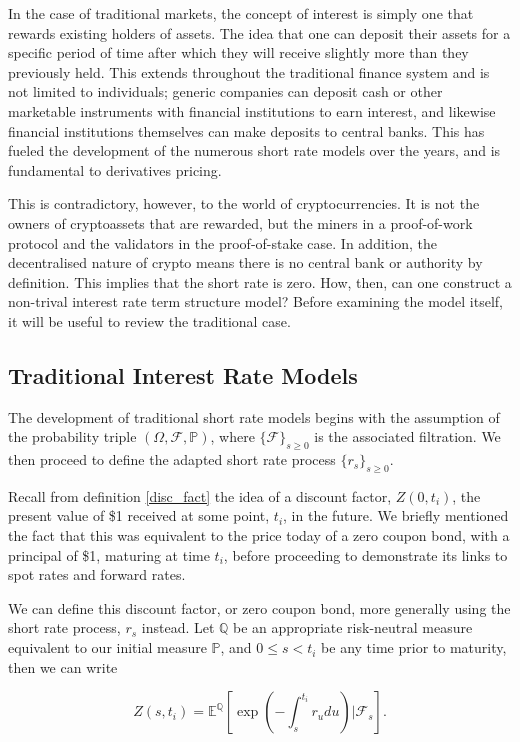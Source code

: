 In the case of traditional markets, the concept of interest is simply one that rewards existing holders of assets. The idea that one can deposit their assets for a specific period of time after which they will receive slightly more than they previously held. This extends throughout the traditional finance system and is not limited to individuals; generic companies can deposit cash or other marketable instruments with financial institutions to earn interest, and likewise financial institutions themselves can make deposits to central banks. This has fueled the development of the numerous short rate models over the years, and is fundamental to derivatives pricing. 

This is contradictory, however, to the world of cryptocurrencies. It is not the owners of cryptoassets that are rewarded, but the miners in a proof-of-work protocol and the validators in the proof-of-stake case. In addition, the decentralised nature of crypto means there is no central bank or authority by definition. This implies that the short rate is zero. How, then, can one construct a non-trival interest rate term structure model? Before examining the model itself, it will be useful to review the traditional case.

\subsection{Traditional Interest Rate Models}
The development of traditional short rate models begins with the assumption of the probability triple $(\Omega, \mathcal{F}, \mathbb{P})$, where $\{\mathcal{F}\}_{s \geq 0}$ is the associated filtration. We then proceed to define the adapted short rate process $\{r_s\}_{s \geq 0}$. 

Recall from definition \ref{disc_fact} the idea of a discount factor, $Z(0,t_i)$, the present value of \$1 received at some point, $t_i$, in the future. We briefly mentioned the fact that this was equivalent to the price today of a zero coupon bond, with a principal of \$1, maturing at time $t_i$, before proceeding to demonstrate its links to spot rates and forward rates.

We can define this discount factor, or zero coupon bond, more generally using the short rate process, $r_s$ instead. Let $\mathbb{Q}$ be an appropriate risk-neutral measure equivalent to our initial measure $\mathbb{P}$, and $0 \leq s < t_i$ be any time prior to maturity, then we can write

\begin{equation}
\label{zcb_expectation}
    Z(s, t_i) = \mathbb{E}^{\mathbb{Q}} \left[ \exp \left( - \int_{s}^{t_i} r_u du \right) \bigg \vert \mathcal{F}_s \right].
\end{equation}

